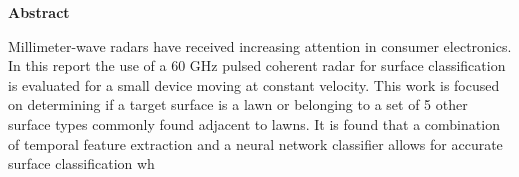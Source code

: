 \newenvironment{abstract}%
    {\cleardoublepage\thispagestyle{empty}\null\vfill\begin{center}%
    \bfseries{\textsf{Abstract}}\end{center}}%
    {\vfill\null}
        \begin{abstract}
        Millimeter-wave radars have received increasing attention in consumer electronics. In this report the use of a 60 GHz pulsed coherent radar for surface classification is evaluated for a small device moving at constant velocity. This work is focused on determining if a target surface is a lawn or belonging to a set of 5 other surface types commonly found adjacent to lawns. It is found that a combination of temporal feature extraction and a neural network classifier allows for accurate surface classification wh

        \end{abstract}
